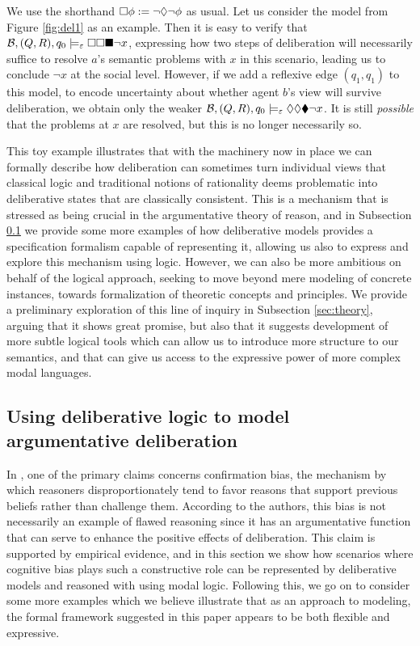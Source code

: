\documentclass[greybox]{svmult}
\newcommand{\views}{\mathcal B}
\newcommand{\sem}{\varepsilon}
\begin{document}
We use the shorthand $\square \phi := \neg \lozenge \neg \phi$ as usual. Let us consider the model from Figure \ref{fig:del1} as an example. Then it is easy to verify that $\views, (Q,R), q_0 \models_\sem \abox \abox \cbox \neg x$, expressing how two steps of deliberation will necessarily suffice to resolve $a$'s semantic problems with $x$ in this scenario, leading us to conclude $\neg x$ at the social level. However, if we add a reflexive edge $(q_1,q_1)$ to this model, to encode uncertainty about whether agent $b$'s view will survive deliberation, we obtain only the weaker $\views, (Q,R),q_0 \models_\sem \adia \adia \cdia \neg x$. It is still \emph{possible} that the problems at $x$ are resolved, but this is no longer necessarily so.

This toy example illustrates that with the machinery now in place we can formally describe how deliberation can sometimes turn individual views that classical logic and traditional notions of rationality deems problematic into deliberative states that are classically consistent. This is a mechanism that is stressed as being crucial in the argumentative theory of reason, and in Subsection \ref{sec:examples} we provide some more examples of how deliberative models provides a specification formalism capable of representing it, allowing us also to express and explore this mechanism using logic. However, we can also be more ambitious on behalf of the logical approach, seeking to move beyond mere modeling of concrete instances, towards formalization of theoretic concepts and principles. We provide a preliminary exploration of this line of inquiry in Subsection \ref{sec:theory}, arguing that it shows great promise, but also that it suggests development of more subtle logical tools which can allow us to introduce more structure to our semantics, and that can give us access to the expressive power of more complex modal languages. 

\subsection{Using deliberative logic to model argumentative deliberation}\label{sec:examples}

In \cite{whyreason}, one of the primary claims concerns confirmation bias, the mechanism by which reasoners disproportionately tend to favor reasons that support previous beliefs rather than challenge them. According to the authors, this bias is not necessarily an example of flawed reasoning since it has an argumentative function that can serve to enhance the positive effects of deliberation. This claim is supported by empirical evidence, and in this section we show how scenarios where cognitive bias plays such a constructive role can be represented by deliberative models and reasoned with using modal logic. Following this, we go on to consider some more examples which we believe illustrate that as an approach to modeling, the formal framework suggested in this paper appears to be both flexible and expressive. 
\end{document}
